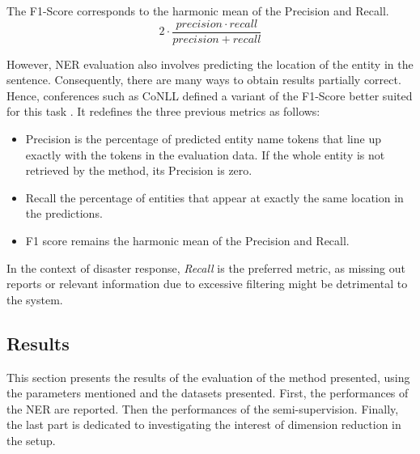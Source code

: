 The F1-Score corresponds to the harmonic mean of the Precision and Recall.
\[2\cdot \frac{precision\cdot recall}{precision + recall}\]

However, NER evaluation also involves predicting the location of the entity in the sentence.
Consequently, there are many ways to obtain results partially correct.
Hence, conferences such as CoNLL defined a variant of the F1-Score better suited for this task \parencite{tjongkimsangIntroductionCoNLL2003Shared2003}.
It redefines the three previous metrics as follows:

\begin{itemize}
    \item Precision is the percentage of predicted entity name tokens that line up exactly with the tokens in the evaluation data.
          If the whole entity is not retrieved by the method, its Precision is zero.
    \item Recall the percentage of entities that appear at exactly the same location in the predictions.
    \item F1 score remains the harmonic mean of the Precision and Recall.
\end{itemize}

In the context of disaster response, \emph{Recall} is the preferred metric, as missing out reports or relevant information due to excessive filtering might be detrimental to the system.


\subsection{Results}
This section presents the results of the evaluation of the method presented, using the
parameters mentioned and the datasets presented.
First, the performances of the NER are reported.
Then the performances of the semi-supervision.
Finally, the last part is dedicated to investigating the interest of dimension reduction in the setup.

